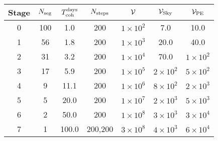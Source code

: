 \begin{tabular}{c|cccccc}
Stage & $N_{\rm seg}$ & $T_{\rm coh}^{\rm days}$ &$N_{\rm steps}$ & $\mathcal{V}$ & $\mathcal{V}_{\rm Sky}$ & $\mathcal{V}_{\rm PE}$ \\ \hline
0 & 100 & 1.0 & 200 & $1{\times}10^{2}$ & 7.0 & 10.0 \\
1 & 56 & 1.8 & 200 & $1{\times}10^{3}$ & 20.0 & 40.0 \\
2 & 31 & 3.2 & 200 & $1{\times}10^{4}$ & 70.0 & $1{\times}10^{2}$ \\
3 & 17 & 5.9 & 200 & $1{\times}10^{5}$ & $2{\times}10^{2}$ & $5{\times}10^{2}$ \\
4 & 9 & 11.1 & 200 & $1{\times}10^{6}$ & $8{\times}10^{2}$ & $2{\times}10^{3}$ \\
5 & 5 & 20.0 & 200 & $1{\times}10^{7}$ & $2{\times}10^{3}$ & $5{\times}10^{3}$ \\
6 & 2 & 50.0 & 200 & $1{\times}10^{8}$ & $3{\times}10^{3}$ & $3{\times}10^{4}$ \\
7 & 1 & 100.0 & 200,200 & $3{\times}10^{8}$ & $4{\times}10^{3}$ & $6{\times}10^{4}$ \\
\end{tabular}
